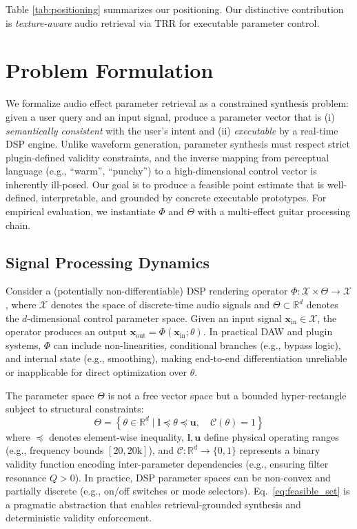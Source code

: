 Table \ref{tab:positioning} summarizes our positioning. Our distinctive contribution is \textit{texture-aware} audio retrieval via TRR for executable parameter control.

\section{Problem Formulation}
\label{sec:problem_formulation}

We formalize audio effect parameter retrieval as a constrained synthesis problem: given a user query and an input signal, produce a parameter vector that is (i) \textit{semantically consistent} with the user's intent and (ii) \textit{executable} by a real-time DSP engine. Unlike waveform generation, parameter synthesis must respect strict plugin-defined validity constraints, and the inverse mapping from perceptual language (e.g., ``warm'', ``punchy'') to a high-dimensional control vector is inherently ill-posed. Our goal is to produce a feasible point estimate that is well-defined, interpretable, and grounded by concrete executable prototypes. For empirical evaluation, we instantiate $\Phi$ and $\Theta$ with a multi-effect guitar processing chain.

\subsection{Signal Processing Dynamics}
Consider a (potentially non-differentiable) DSP rendering operator $\Phi: \mathcal{X} \times \Theta \to \mathcal{X}$, where $\mathcal{X}$ denotes the space of discrete-time audio signals and $\Theta \subset \mathbb{R}^d$ denotes the $d$-dimensional control parameter space. Given an input signal $\mathbf{x}_{\text{in}} \in \mathcal{X}$, the operator produces an output $\mathbf{x}_{\text{out}} = \Phi(\mathbf{x}_{\text{in}}; \theta)$.
In practical DAW and plugin systems, $\Phi$ can include non-linearities, conditional branches (e.g., bypass logic), and internal state (e.g., smoothing), making end-to-end differentiation unreliable or inapplicable for direct optimization over $\theta$.

The parameter space $\Theta$ is not a free vector space but a bounded hyper-rectangle subject to structural constraints:
\begin{equation}
    \label{eq:feasible_set}
    \Theta = \left\{ \theta \in \mathbb{R}^d \mid \mathbf{l} \preceq \theta \preceq \mathbf{u}, \quad \mathcal{C}(\theta) = 1 \right\}
\end{equation}
where $\preceq$ denotes element-wise inequality, $\mathbf{l}, \mathbf{u}$ define physical operating ranges (e.g., frequency bounds $[20, 20\text{k}]$), and $\mathcal{C}: \mathbb{R}^d \to \{0, 1\}$ represents a binary validity function encoding inter-parameter dependencies (e.g., ensuring filter resonance $Q > 0$).
In practice, DSP parameter spaces can be non-convex and partially discrete (e.g., on/off switches or mode selectors). Eq.~\ref{eq:feasible_set} is a pragmatic abstraction that enables retrieval-grounded synthesis and deterministic validity enforcement.

